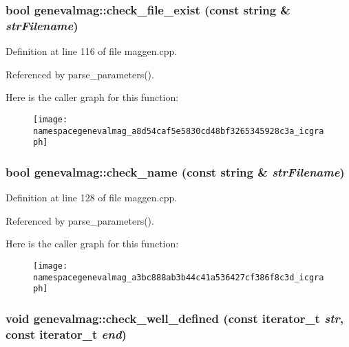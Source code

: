 \hypertarget{namespacegenevalmag_a8d54caf5e5830cd48bf3265345928c3a}{
\subsubsection[{check\_\-file\_\-exist}]{\setlength{\rightskip}{0pt plus 5cm}bool genevalmag::check\_\-file\_\-exist (const string \& {\em strFilename})}}
\label{namespacegenevalmag_a8d54caf5e5830cd48bf3265345928c3a}


Definition at line 116 of file maggen.cpp.



Referenced by parse\_\-parameters().



Here is the caller graph for this function:\nopagebreak
\begin{figure}[H]
\begin{center}
\leavevmode
\texttt{[image: namespacegenevalmag\_a8d54caf5e5830cd48bf3265345928c3a\_icgraph]}
\end{center}
\end{figure}


\hypertarget{namespacegenevalmag_a3bc888ab3b44c41a536427cf386f8c3d}{
\subsubsection[{check\_\-name}]{\setlength{\rightskip}{0pt plus 5cm}bool genevalmag::check\_\-name (const string \& {\em strFilename})}}
\label{namespacegenevalmag_a3bc888ab3b44c41a536427cf386f8c3d}


Definition at line 128 of file maggen.cpp.



Referenced by parse\_\-parameters().



Here is the caller graph for this function:\nopagebreak
\begin{figure}[H]
\begin{center}
\leavevmode
\texttt{[image: namespacegenevalmag\_a3bc888ab3b44c41a536427cf386f8c3d\_icgraph]}
\end{center}
\end{figure}


\hypertarget{namespacegenevalmag_ac8f04dfdf39c964f9219cc5a7fb7197b}{
\subsubsection[{check\_\-well\_\-defined}]{\setlength{\rightskip}{0pt plus 5cm}void genevalmag::check\_\-well\_\-defined (const iterator\_\-t {\em str}, \/  const iterator\_\-t {\em end})}}
\label{namespacegenevalmag_ac8f04dfdf39c964f9219cc5a7fb7197b}


